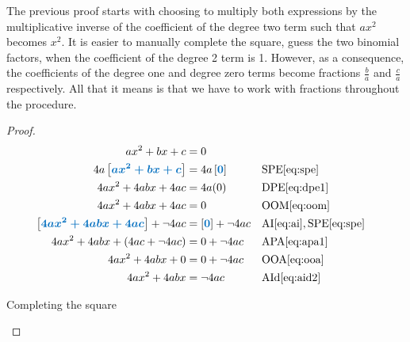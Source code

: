 \documentclass[20150903-160354-rs2.2-MarksMathNotebook.tex]{subfiles}
\begin{document}
The previous proof starts with choosing to multiply both expressions by the multiplicative inverse of the coefficient of the degree two term such that $ax^2$ becomes $x^2$.  It is easier to manually complete the square, guess the two binomial factors, when the coefficient of the degree 2 term is 1.  However, as a consequence, the coefficients of the degree one and degree zero terms become fractions $\frac{b}{a}$ and $\frac{c}{a}$ respectively.  All that it means is that we have to work with fractions throughout the procedure.  \\

\begin{proof}
\begin{align*}
ax^2+bx+c & = 0 \\
4a \farg{ax^2+bx+c} &= 4a \farg{0} && \text{SPE} \eqref{eq:spe} \\
4ax^2+4abx+4ac &= 4a(0) && \text{DPE} \eqref{eq:dpe1} \\
4ax^2+4abx+4ac &= 0 && \text{OOM} \eqref{eq:oom} \\
\farg{4ax^2+4abx+4ac}+\neg 4ac &= \farg{0}+\neg 4ac && \text{AI} \eqref{eq:ai},\text{SPE} \eqref{eq:spe}  \\
4ax^2+4abx+(4ac+ \neg 4ac) &= 0+\neg 4ac && \text{APA} \eqref{eq:apa1} \\
4ax^2+4abx+0 &= 0+\neg 4ac && \text{OOA} \eqref{eq:ooa} \\
4ax^2+4abx &= \neg 4ac && \text{AId} \eqref{eq:aid2} \\
\end{align*}	

Completing the square
\begin{center}
\end{center}
\end{proof}
\end{document}
